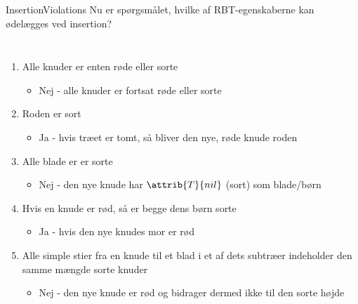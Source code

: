 \documentclass[aspectratio=1610]{beamer}
\begin{document}
\begin{frame}{Insertion}{Violations}
    Nu er spørgsmålet, hvilke af RBT-egenskaberne kan ødelægges ved insertion?

    \begin{columns}[t]

        \begin{enumerate}[<+(1)->]
            \item Alle knuder er enten røde eller sorte
                \begin{itemize}
                    \footnotesize
                    \item \alert{Nej} - alle knuder er fortsat røde eller sorte
                \end{itemize}
            \item Roden er sort
                \begin{itemize}
                    \footnotesize
                    \item \alert{Ja} - hvis træet er tomt, så bliver den nye,
                        røde knude roden
                \end{itemize}
            \item Alle blade er er sorte
                \begin{itemize}
                    \footnotesize
                    \item \alert{Nej} - den nye knude har $\attrib{T}{nil}$
                        (sort) som blade/børn
                \end{itemize}
            \item Hvis en knude er rød, så er begge dens børn sorte
                \begin{itemize}
                    \footnotesize
                    \item \alert{Ja} - hvis den nye knudes mor er rød
                \end{itemize}
            \item Alle simple stier fra en knude til et blad i et af dets
                subtræer indeholder den samme mængde sorte knuder
                \begin{itemize}
                    \footnotesize
                    \item \alert{Nej} - den nye knude er rød og bidrager dermed
                        ikke til den sorte højde
                \end{itemize}
        \end{enumerate}


\end{columns}
\end{frame}
\end{document}
